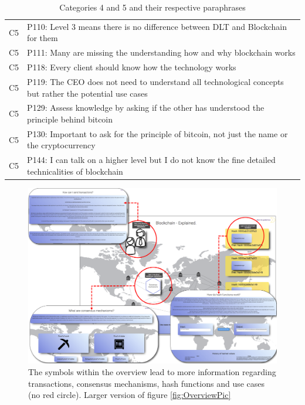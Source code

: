 \begin{table}[H]
\begin{tabularx}{\textwidth}{l|X}
	C5 & P110: Level 3 means there is no difference between DLT and Blockchain for them \\  
	C5 & P111: Many are missing the understanding how and why blockchain works \\  
	C5 & P118: Every client should know how the technology works \\  
	C5 & P119: The CEO does not need to understand all technological concepts but rather the potential use cases \\  
	C5 & P129: Assess knowledge by asking if the other has understood the principle behind bitcoin \\
	C5 & P130: Important to ask for the principle of bitcoin, not just the name or the cryptocurrency \\  
	C5 & P144: I can talk on a higher level but I do not know the fine detailed technicalities of blockchain \\  
    \end{tabularx}
    \caption{Categories 4 and 5 and their respective paraphrases}
\end{table}


 \label{anhang:OverviewBild}

\begin{figure}[H]
    \centering
    \includegraphics[height=0.9\textwidth, angle=90]{latex-vorlage_v1.5/graphics/Overview_Big.png}
    \caption{The symbols within the overview lead to more information regarding transactions, consensus mechanisms, hash functions and use cases (no red circle). Larger version of figure \ref{fig:OverviewPic}}
    \label{fig:my_label}
\end{figure}


